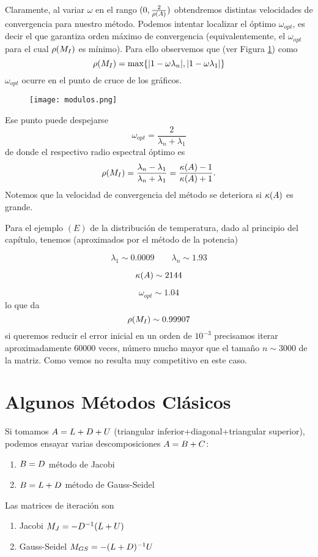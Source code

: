 Claramente, al variar $\omega$ en el rango $(0,\frac{2}{\rho(\Ab)})$ obtendremos distintas velocidades de convergencia para nuestro método. Podemos intentar localizar el óptimo $\omega_{opt}$, es decir el que garantiza orden máximo de convergencia (equivalentemente, el $\omega_{opt}$ para el cual $\rho(\Mb_I)$ es mínimo). Para ello observemos que   (ver Figura \ref{fig:modulos}) como
$$
\rho(\Mb_I)=\max\{
|1-\omega   \lambda_n|,|1-\omega   \lambda_1|\}
$$
$\omega_{opt}$ ocurre en el punto de cruce de los gráficos.
\begin{figure}[h]
\label{fig:modulos}
\centering\texttt{[image: modulos.png]}
\end{figure}
Ese punto puede despejarse 
$$
\omega_{opt}=\frac{2}{\lambda_n+\lambda_1}
$$
de donde el respectivo radio espectral óptimo es 
$$\rho(\Mb_I)=\frac{\lambda_n-\lambda_1}{\lambda_n+\lambda_1}=\frac{\kappa(\Ab)-1}{\kappa(\Ab)+1}.
$$
Notemos que la velocidad de convergencia del método se deteriora si  $\kappa(\Ab)$ es grande.

\tcc
Para el ejemplo $(E)$ de la distribución de temperatura, dado al principio del capítulo, tenemos (aproximados por el método de la potencia)

$$
\lambda_1\sim 0.0009 \qquad \lambda_n \sim 1.93
$$

$$\kappa(\Ab)\sim 2144$$

$$\omega_{opt}\sim
1.04$$
lo que da
$$\rho(\Mb_I)\sim 0.99907$$
si queremos reducir  el error inicial en un orden  de $10^{-3}$ precisamos iterar aproximadamente $60000$ veces, número mucho mayor que el tamaño  $n\sim 3000$ de la matriz. Como vemos no resulta muy competitivo en este caso. 
\etcc


\section{Algunos Métodos Clásicos}



Si tomamos $\Ab=\Lb+\Db+\Ub$ (triangular inferior+diagonal+triangular superior), podemos ensayar varias descomposiciones $\Ab=\Bb+\Cb$:
\begin{enumerate}
 \item $\Bb=\Db$ método de Jacobi
 \item $\Bb=\Lb+\Db$ método de Gauss-Seidel
\end{enumerate}

Las matrices de iteración son
\begin{enumerate}
 \item Jacobi $\Mb_J=-\Db^{-1}(\Lb+\Ub)$
 \item Gauss-Seidel $\Mb_{GS}=-(\Lb+\Db)^{-1}\Ub$
\end{enumerate}

